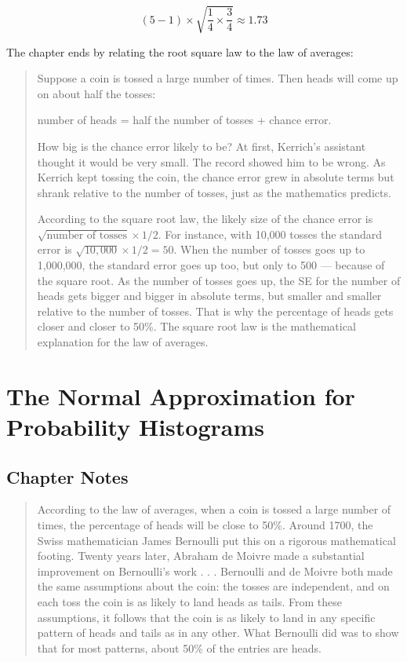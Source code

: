 \documentclass[
]{book}
\begin{document}
\[
\left( 5 - 1 \right) \times \sqrt{\frac{1}{4} \times \frac{3}{4}} \approx 1.73
\]

The chapter ends by relating the root square law to the law of averages:

\begin{quote}
Suppose a coin is tossed a large number of times. Then heads will come up on about half the
tosses:

number of heads = half the number of tosses + chance error.

How big is the chance error likely to be? At first, Kerrich's assistant thought it would be very small. The record showed him to be wrong. As Kerrich kept tossing the coin, the chance error grew in absolute terms but shrank relative to the number of tosses, just as the mathematics predicts.

According to the square root law, the likely size of the chance error is \(\sqrt{\text{number of tosses}} \times 1/2\). For instance, with 10,000 tosses the standard error is \(\sqrt{10,000} \times 1/2 = 50\). When the number of tosses goes up to 1,000,000, the standard error goes up too, but only to 500 --- because of the square root. As the number of tosses goes up, the SE for the number of heads gets bigger and bigger in absolute terms, but smaller and smaller relative to the number of tosses. That is why the percentage of heads gets closer and closer to 50\%. The square root law is the mathematical explanation for the law of averages.
\end{quote}

\hypertarget{normal_approx_prob}{%
\chapter{The Normal Approximation for Probability Histograms}\label{normal_approx_prob}}

\hypertarget{chapter-notes-17}{%
\section{Chapter Notes}\label{chapter-notes-17}}

\begin{quote}
According to the law of averages, when a coin is tossed a large number of times, the percentage of heads will be close to 50\%. Around 1700, the Swiss mathematician James Bernoulli put this on a rigorous mathematical footing. Twenty years later, Abraham de Moivre made a substantial improvement on Bernoulli's
work . . . Bernoulli and de Moivre both made the same assumptions about the coin: the tosses are independent, and on each toss the coin is as likely to land heads as tails. From these assumptions, it follows that the coin is as likely to land in any specific pattern of heads and tails as in any other. What Bernoulli did was to show that for most patterns, about 50\% of the entries are heads.
\end{quote}
\end{document}
